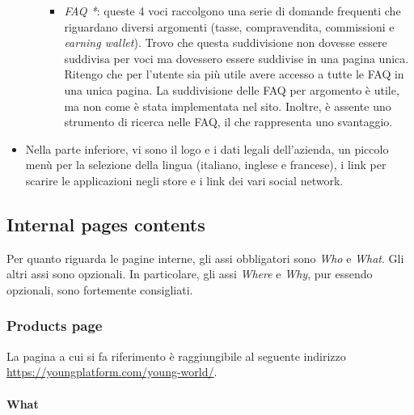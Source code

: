 \begin{itemize}
\begin{itemize}
\begin{itemize}
      \item \textit{FAQ *}: queste 4 voci raccolgono una serie di domande 
      frequenti che riguardano diversi argomenti (tasse, compravendita, 
      commissioni e \textit{earning wallet}). Trovo che questa suddivisione 
      non dovesse essere suddivisa per voci ma dovessero essere suddivise in 
      una pagina unica. Ritengo che per l'utente sia più utile avere accesso 
      a tutte le FAQ in una unica pagina. La suddivisione delle FAQ per 
      argomento è utile, ma non come è stata implementata nel sito. Inoltre, 
      è assente uno strumento di ricerca nelle FAQ, il che rappresenta uno 
      svantaggio.
    \end{itemize}
  \end{itemize}

  \item Nella parte inferiore, vi sono il logo e i dati legali dell'azienda, 
  un piccolo menù per la selezione della lingua (italiano, inglese e 
  francese), i link per scarire le applicazioni negli store e i link dei 
  vari social network.
\end{itemize}

\subsection{Internal pages contents}

Per quanto riguarda le pagine interne, gli assi obbligatori sono 
\textit{Who} e \textit{What}. Gli altri assi sono opzionali. In particolare, 
gli assi \textit{Where} e \textit{Why}, pur essendo opzionali, sono 
fortemente consigliati.

\subsubsection{Products page}

La pagina a cui si fa riferimento è raggiungibile al seguente indirizzo 
\href{https://youngplatform.com/young-world/}{https://youngplatform.com/young-world/}.

\paragraph{What}

